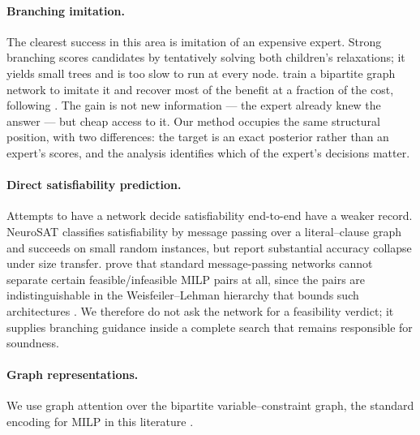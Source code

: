 \documentclass[preprint,12pt]{elsarticle}
\begin{document}
\paragraph{Branching imitation.} The clearest success in this area is imitation of an expensive expert. Strong branching scores candidates by tentatively solving both children's relaxations; it yields small trees and is too slow to run at every node. \citet{gasse2019exact} train a bipartite graph network to imitate it and recover most of the benefit at a fraction of the cost, following \citet{khalil2016learning}. The gain is not new information --- the expert already knew the answer --- but cheap access to it. Our method occupies the same structural position, with two differences: the target is an exact posterior rather than an expert's scores, and the analysis identifies which of the expert's decisions matter.

\paragraph{Direct satisfiability prediction.} Attempts to have a network decide satisfiability end-to-end have a weaker record. NeuroSAT \citep{selsam2019neurosat} classifies satisfiability by message passing over a literal--clause graph and succeeds on small random instances, but \citet{li2023g4satbench} report substantial accuracy collapse under size transfer. \citet{chen2023representing} prove that standard message-passing networks cannot separate certain feasible/infeasible MILP pairs at all, since the pairs are indistinguishable in the Weisfeiler--Lehman hierarchy that bounds such architectures \citep{xu2019powerful}. We therefore do not ask the network for a feasibility verdict; it supplies branching guidance inside a complete search that remains responsible for soundness.

\paragraph{Graph representations.} We use graph attention \citep{velickovic2018graph} over the bipartite variable--constraint graph, the standard encoding for MILP in this literature \citep{gasse2019exact}.
\end{document}
